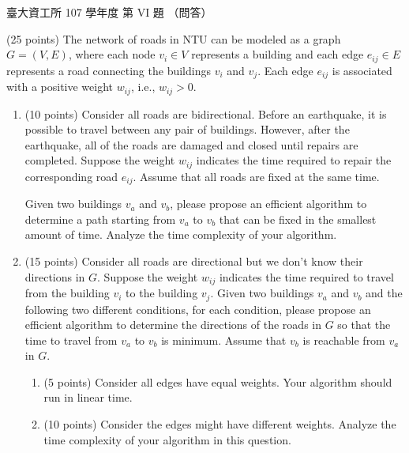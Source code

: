 \begin{pastexam}[label={px:ntu-107-dsa-06}]{臺大資工所 107 學年度 第 VI 題}
（問答）

(25 points) The network of roads in NTU can be modeled as a graph $G=(V,E)$, where each node
$v_i\in V$ represents a building and each edge $e_{ij}\in E$ represents a road connecting the
buildings $v_i$ and $v_j$. Each edge $e_{ij}$ is associated with a positive weight $w_{ij}$, i.e.,
$w_{ij}>0$.
\begin{enumerate}[label=(\alph*)]
\item (10 points) Consider all roads are bidirectional. Before an earthquake, it is possible to
travel between any pair of buildings. However, after the earthquake, all of the roads are damaged
and closed until repairs are completed. Suppose the weight $w_{ij}$ indicates the time required to
repair the corresponding road $e_{ij}$. Assume that all roads are fixed at the same time.

Given two buildings $v_a$ and $v_b$, please propose an efficient algorithm to determine a path
starting from $v_a$ to $v_b$ that can be fixed in the smallest amount of time. Analyze the time
complexity of your algorithm.
\item (15 points) Consider all roads are directional but we don't know their directions in $G$.
Suppose the weight $w_{ij}$ indicates the time required to travel from the building $v_i$ to the
building $v_j$. Given two buildings $v_a$ and $v_b$ and the following two different conditions,
for each condition, please propose an efficient algorithm to determine the directions of the roads
in $G$ so that the time to travel from $v_a$ to $v_b$ is minimum. Assume that $v_b$ is reachable
from $v_a$ in $G$.
\begin{enumerate}[label=(\arabic*)]
\item (5 points) Consider all edges have equal weights. Your algorithm should run in linear time.
\item (10 points) Consider the edges might have different weights. Analyze the time complexity of
your algorithm in this question.
\end{enumerate}
\end{enumerate}
\end{pastexam}

